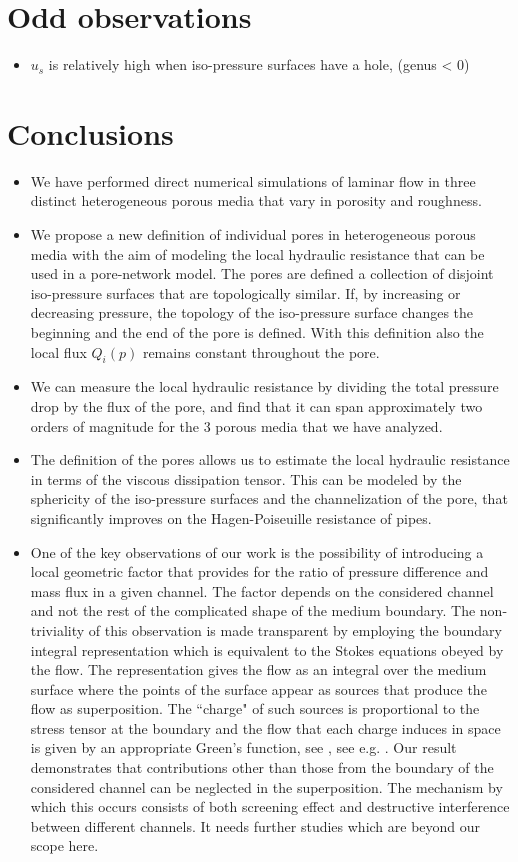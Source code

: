 \documentclass[draft]{agujournal2019}
\begin{document}
\section{Odd observations}
\begin{itemize}
	\item $u_s$ is relatively high when iso-pressure surfaces have a hole, (genus < 0)
\end{itemize}

\section{Conclusions}
\begin{itemize}
	\item We have performed direct numerical simulations of laminar flow in three distinct heterogeneous porous media that vary in porosity and roughness.  
	\item We propose a new definition of individual pores in heterogeneous porous media with the aim of modeling the local hydraulic resistance that can be used in a pore-network model. The pores are defined a collection of disjoint iso-pressure surfaces that are topologically similar. If, by increasing or decreasing pressure, the topology of the iso-pressure surface changes the beginning and the end of the pore is defined. With this definition also the local flux $Q_i(p)$ remains constant throughout the pore. 
	\item We can measure the local hydraulic resistance by dividing the total pressure drop by the flux of the pore, and find that it can span approximately two orders of magnitude for the 3 porous media that we have analyzed. 
	\item The definition of the pores allows us to estimate the local hydraulic resistance in terms of the viscous dissipation tensor. This can be modeled by the sphericity of the iso-pressure surfaces and the channelization of the pore, that significantly improves on the Hagen-Poiseuille resistance of pipes. 
	\item One of the key observations of our work is the possibility of introducing a local geometric factor that provides for the ratio of pressure difference and mass flux in a given channel. The factor depends on the considered channel and not the rest of the complicated shape of the medium boundary. The non-triviality of this observation is made transparent by employing the boundary integral representation which is equivalent to the Stokes equations obeyed by the flow. The representation gives the flow as an integral over the medium surface where the points of the surface appear as sources that produce the flow as superposition. The ``charge" of such sources is proportional to the stress tensor at the boundary and the flow that each charge induces in space is given by an appropriate Green's function, see , see e.g. \cite{pozrikidis_boundary_1992}. Our result demonstrates that contributions other than those from the boundary of the considered channel can be neglected in the superposition. The mechanism by which this occurs consists of both screening effect and destructive interference between different channels. It needs further studies which are beyond our scope here.
\end{itemize}
\end{document}
